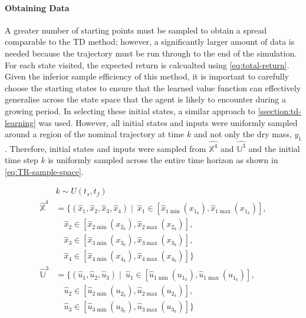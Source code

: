 \paragraph{Obtaining Data}
A greater number of starting points must be sampled to obtain a spread comparable to the TD method; however, a significantly larger amount of data is needed because the trajectory must be run through to the end of the simulation. For each state visited, the expected return is calcualted using \autoref{eq:total-return}. Given the inferior sample efficiency of this method, it is important to carefully choose the starting states to ensure that the learned value function can effectively generalise across the state space that the agent is likely to encounter during a growing period. In selecting these initial states, a similar approach to \autoref{ssection:td-learning} was used. However, all initial states and inputs were uniformly sampled around a region of the nominal trajectory at time $k$ and not only the dry mass, $y_1$. Therefore, initial states and inputs were sampled from $\hat{\mathbb{X}^4}$ and $\hat{\mathbb{U}^3}$ and the initial time step $k$ is uniformly sampled across the entire time horizon as shown in \autoref{eq:TR-sample-space}.

\begin{equation}\label{eq:TR-sample-space}
\begin{split}
	& k \sim U(t_s,t_f)  \\
    \hat{\mathbb{X}}^4 &= \{ (\hat{x}_1, \hat{x}_2, \hat{x}_3, \hat{x}_4) \mid\ \hat{x}_1 \in [\hat{x}_{1\min}(x_{1_k}), \hat{x}_{1\max}(x_{1_k})], \\
    &\quad \hat{x}_2 \in [\hat{x}_{2\min}(x_{2_k}), \hat{x}_{2\max}(x_{2_k})], \\
    &\quad \hat{x}_3 \in [\hat{x}_{3\min}(x_{3_k}), \hat{x}_{3\max}(x_{3_k})], \\
    &\quad \hat{x}_4 \in [\hat{x}_{4\min}(x_{4_k}), \hat{x}_{4\max}(x_{4_k})] \} \\
    \hat{\mathbb{U}}^3 &= \{ (\hat{u}_1, \hat{u}_2, \hat{u}_3) \mid\ \hat{u}_1 \in [\hat{u}_{1\min}(u_{1_k}), \hat{u}_{1\max}(u_{1_k})], \\
    &\quad \hat{u}_2 \in [\hat{u}_{2\min}(u_{2_k}), \hat{u}_{2\max}(u_{2_k})], \\
    &\quad \hat{u}_3 \in [\hat{u}_{3\min}(u_{3_k}), \hat{u}_{3\max}(u_{3_k})] \} \\    
\end{split}
\end{equation}

